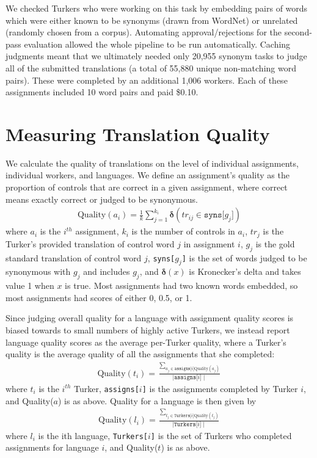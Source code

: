 \documentclass[11pt]{article}
\begin{document}
We checked Turkers who were working on this task by embedding pairs of words which were either known to be synonyms (drawn from WordNet) or  unrelated (randomly chosen from a corpus). 
Automating approval/rejections for the second-pass evaluation allowed the whole pipeline to be run automatically.  Caching judgments meant that we ultimately needed only 
20,955 synonym tasks to judge all of the submitted translations (a total of 55,880 unique non-matching word pairs).  These were completed by an additional 1,006 workers.  Each of these assignments included 10 word pairs and paid \$0.10.



\section{Measuring Translation Quality}

We calculate the quality of translations on the level of individual assignments, individual workers, and languages.  We define an assignment's quality as the proportion of controls that are correct in a given assignment, where correct means exactly correct or judged to be synonymous.
\begin{align}	
	\text{Quality}(a_i) = \frac{1}{k}\sum\limits_{j=1}^{k_i}\mathbf{\delta}(tr_{ij} \in \texttt{syns[$g_j$]})
\end{align}	
where $a_i$ is the $i^{th}$ assignment, $k_i$ is the number of controls in $a_i$, $tr_j$ is the Turker's provided translation of control word $j$ in assignment $i$, $g_j$ is the gold standard translation of control word $j$, \texttt{syns[$g_j$]} is the set of words judged to be synonymous with $g_j$ and includes $g_j$, and $\mathbf{\delta}(x)$ is Kronecker's delta and takes value 1 when $x$ is true. 
Most assignments had two known words embedded, so most assignments had scores of either 0, 0.5, or 1. 

Since judging overall quality for a language with assignment quality scores is biased towards to small numbers of highly active Turkers, we instead report language quality scores as the average per-Turker quality, where a Turker's quality is  the average quality of all the assignments that she completed:
\begin{align}	
	\text{Quality}(t_i) = \frac{\sum_{a_j \in \texttt{assigns[$i$]}\text{Quality}(a_j)}}{\mid \texttt{assigns[$i$]} \mid}
\end{align}	
where $t_i$ is the $i^{th}$ Turker, \texttt{assigns[$i$]} is the assignments completed by Turker $i$, and Quality($a$) is as above.
%
Quality for a language is then given by
\begin{align}	
	\text{Quality}(l_i) = \frac{\sum_{t_j \in \texttt{Turkers[$i$]}\text{Quality}(t_j)}}{\mid \texttt{Turkers[$i$]} \mid}
\end{align}	
where $l_i$ is the ith language, \texttt{Turkers[$i$]} is the set of Turkers who completed assignments for language $i$, and Quality($t$) is as above.
\end{document}
